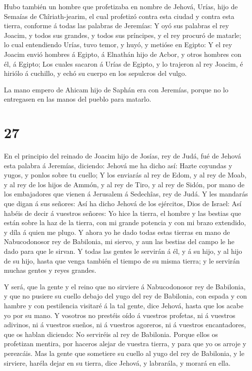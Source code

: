  Hubo también un hombre que profetizaba en nombre de
Jehová, Urías, hijo de Semaías de Chîriath-jearim, el cual profetizó
contra esta ciudad y contra esta tierra, conforme á todas las palabras
de Jeremías:  Y oyó sus palabras el rey Joacim, y todos sus
grandes, y todos sus príncipes, y el rey procuró de matarle; lo cual
entendiendo Urías, tuvo temor, y huyó, y metióse en Egipto:
 Y el rey Joacim envió hombres á Egipto, á Elnathán hijo de
Acbor, y otros hombres con él, á Egipto;  Los cuales
sacaron á Urías de Egipto, y lo trajeron al rey Joacim, é hiriólo á
cuchillo, y echó su cuerpo en los sepulcros del vulgo.

 La mano empero de Ahicam hijo de Saphán era con Jeremías,
porque no lo entregasen en las manos del pueblo para matarlo.

\hypertarget{section-26}{%
\section{27}\label{section-26}}

 En el principio del reinado de Joacim hijo de Josías, rey
de Judá, fué de Jehová esta palabra á Jeremías, diciendo: 
Jehová me ha dicho así: Hazte coyundas y yugos, y ponlos sobre tu
cuello;  Y los enviarás al rey de Edom, y al rey de Moab, y
al rey de los hijos de Ammón, y al rey de Tiro, y al rey de Sidón, por
mano de los embajadores que vienen á Jerusalem á Sedechîas, rey de Judá.
 Y les mandarás que digan á sus señores: Así ha dicho Jehová
de los ejércitos, Dios de Israel: Así habéis de decir á vuestros
señores:  Yo hice la tierra, el hombre y las bestias que
están sobre la haz de la tierra, con mi grande potencia y con mi brazo
extendido, y díla á quien me plugo.  Y ahora yo he dado
todas estas tierras en mano de Nabucodonosor rey de Babilonia, mi
siervo, y aun las bestias del campo le he dado para que le sirvan.
 Y todas las gentes le servirán á él, y á su hijo, y al hijo
de su hijo, hasta que venga también el tiempo de su misma tierra; y le
servirán muchas gentes y reyes grandes.

 Y será, que la gente y el reino que no sirviere á
Nabucodonosor rey de Babilonia, y que no pusiere su cuello debajo del
yugo del rey de Babilonia, con espada y con hambre y con pestilencia
visitaré á la tal gente, dice Jehová, hasta que los acabe yo por su
mano.  Y vosotros no prestéis oído á vuestros profetas, ni á
vuestros adivinos, ni á vuestros sueños, ni á vuestros agoreros, ni á
vuestros encantadores, que os hablan diciendo: No serviréis al rey de
Babilonia.  Porque ellos os profetizan mentira, por haceros
alejar de vuestra tierra, y para que yo os arroje y perezcáis.
 Mas la gente que sometiere su cuello al yugo del rey de
Babilonia, y le sirviere, haréla dejar en su tierra, dice Jehová, y
labrarála, y morará en ella.

